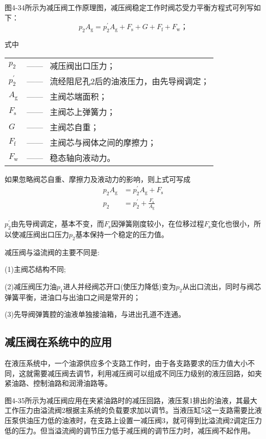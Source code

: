 图4-34所示为减压阀工作原理图，减压阀稳定工作时阀芯受力平衡方程式可列写如下：
\begin{equation}
p_{2}A_\text{g}=p^{'}_{2}A_\text{g}+F_\text{s}+G+F_\text{f}+F_\text{w}；
\end{equation}

\noindent 式中\ 
\begin{tabular}[t]{ll}
$p_{2}$ &—— \ 减压阀出口压力；\\
$p^{'}_{2}$ &—— \ 流经阻尼孔2后的油液压力，由先导阀调定；\\
$A_\text{g}$ &—— \ 主阀芯端面积；\\
$F_\text{s}$ &—— \ 主阀芯上弹簧力；\\
$G$ &—— \ 主阀芯自重；\\
$F_\text{f}$ &—— \ 主阀芯与阀体之间的摩擦力；\\
$F_\text{w}$ &—— \ 稳态轴向液动力。
\end{tabular}  

如果忽略阀芯自重、摩擦力及液动力的影响，则上式可写成
\begin{equation}
\begin{split}
p_{2}A_\text{g}& =p^{'}_{2}A_\text{g}+F_\text{s}\\
p_{2}& =p^{'}_{2}+\frac{F_\text{s}}{A_\text{g}}
\end{split}
\end{equation}

$p^{'}_2$由先导阀调定，基本不变，而$F_\text{s}$因弹簧刚度较小，在位移过程$F_\text{s}$变化也很小，所以使减压阀出口压力$p_{2}$基本保持一个稳定的压力值。

减压阀与溢流阀的主要不同是:

(1)主阀芯结构不同;

(2)减压阀压力油$p_{1}$进人并经阀芯开口(使压力降低)变为$p_{2}$从出口流出，同时与阀芯弹簧平衡，进油口与出油口之间是常开的；

(3)先导阀弹簀腔的油液单独接油箱，与进出孔道不连通。

\subsection{减压阀在系统中的应用}

在液压系统中，一个油源供应多个支路工作时，由于各支路要求的压力值大小不同，这就需要减压阀去调节，利用减压阀可以组成不同压力级别的液压回路，如夹紧油路、控制油路和润滑油路等。

图4-35所示为减压阀应用在夹紧油路时的减压回路，液压泵1排出的油液，其最大工作压力由溢流阀2根据主系统的负载要求加以调节。当液压缸5这一支路需要比液压泵供油压力低的油液时，在支路上设置一减压阀3，就可得到比溢流阀2调定压力低的压力。但当溢流阀的调节压力低于减压阀的调节压力时，减压阀不起作用。

